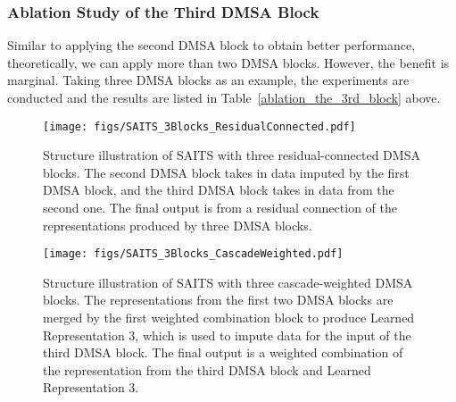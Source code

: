 \documentclass{article}
\begin{document}
\subsubsection{Ablation Study of the Third DMSA Block} \label{why_not_more_than_2_blocks}
Similar to applying the second DMSA block to obtain better performance, theoretically, we can apply more than two DMSA blocks. However, the benefit is marginal. Taking three DMSA blocks as an example, the experiments are conducted and the results are listed in Table~\ref{ablation_the_3rd_block} above.

\begin{figure}[!htb]
	\centering
	\caption{Structure illustration of SAITS with three residual-connected DMSA blocks. The second DMSA block takes in data imputed by the first DMSA block, and the third DMSA block takes in data from the second one. The final output is from a residual connection of the representations produced by three DMSA blocks.}
	\label{fig3}
	\texttt{[image: figs/SAITS\_3Blocks\_ResidualConnected.pdf]}
\end{figure}

\begin{figure}[!htb]
	\caption{Structure illustration of SAITS with three cascade-weighted DMSA blocks. The representations from the first two DMSA blocks are merged by the first weighted combination block to produce Learned Representation 3, which is used to impute data for the input of the third DMSA block. The final output is a weighted combination of the representation from the third DMSA block and Learned Representation 3.}
	\centering
	\texttt{[image: figs/SAITS\_3Blocks\_CascadeWeighted.pdf]}
	\label{fig4}
\end{figure}

\begin{table} [!htb]
	\caption{Ablation experiment results of the third DMSA block. Results of SAITS here are from Table~\ref{tb1} in our paper. Both SAITS-3residual and SAITS-3cascade apply the same hyper-parameters with SAITS.}
	\label{ablation_the_3rd_block}
	\centering
\end{table}
\end{document}
